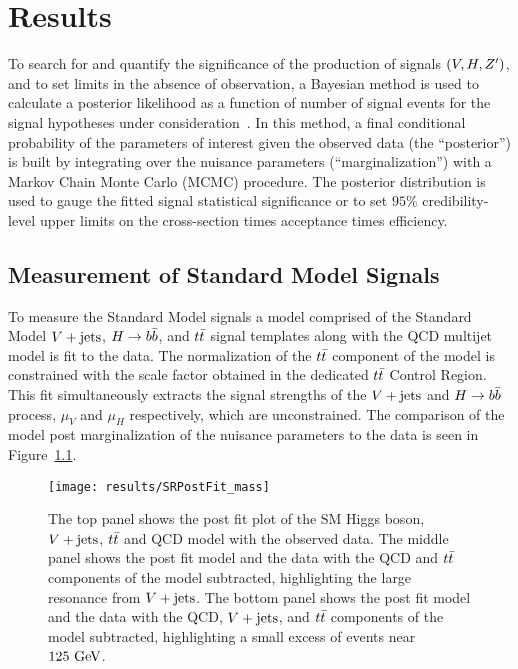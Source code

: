 \chapter{Results}\label{chapter:results}

To search for and quantify the significance of the production of signals $\left(V, H, Z'\right)$, and to set limits in the absence of observation, a Bayesian method is used to calculate a posterior likelihood as a function of number of signal events for the signal hypotheses under consideration~\cite{EXOT-2010-07}.
In this method, a final conditional probability of the parameters of interest given the observed data (the ``posterior'') is built by integrating over the nuisance parameters (``marginalization'') with a Markov Chain Monte Carlo (\Gls{MCMC}) procedure.
The posterior distribution is used to gauge the fitted signal statistical significance or to set $95\%$ credibility-level upper limits on the cross-section times acceptance times efficiency.

\section{Measurement of Standard Model Signals}

To measure the Standard Model signals a model comprised of the Standard Model $V + \text{jets}$, $H \to b\bar{b}$, and $t\bar{t}$ signal templates along with the QCD multijet model is fit to the data.
The normalization of the $t\bar{t}$ component of the model is constrained with the scale factor obtained in the dedicated $t\bar{t}$ Control Region.
This fit simultaneously extracts the signal strengths of the $V + \text{jets}$ and $H \to b\bar{b}$ process, $\mu_{V}$ and $\mu_{H}$ respectively, which are unconstrained.
The comparison of the model post marginalization of the nuisance parameters to the data is seen in Figure~\ref{fig:post_fit}.

\begin{figure}[htbp]
 \centering
 \texttt{[image: results/SRPostFit\_mass]}
 \caption{The top panel shows the post fit plot of the SM Higgs boson, $V + \text{jets}$, $t\bar{t}$ and QCD model with the observed data.
  The middle panel shows the post fit model and the data with the QCD and $t\bar{t}$ components of the model subtracted, highlighting the large resonance from $V + \text{jets}$.
  The bottom panel shows the post fit model and the data with the QCD, $V + \text{jets}$, and $t\bar{t}$ components of the model subtracted, highlighting a small excess of events near $125~\mathrm{GeV}$.
 }
 \label{fig:post_fit}
\end{figure}

